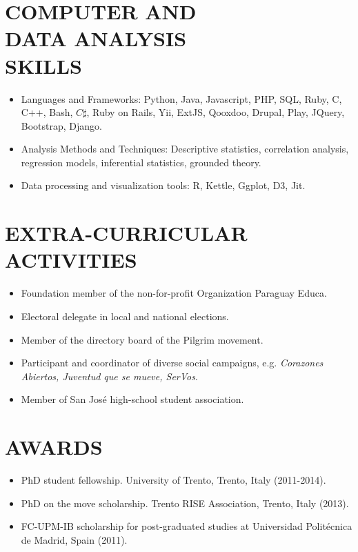 \documentclass[line,margin]{res}
\begin{document}
\begin{resume}
\section{COMPUTER AND \\ DATA ANALYSIS \\ SKILLS} 
\begin{itemize} \itemsep -2pt      
\item Languages and Frameworks: Python, Java, Javascript, PHP, SQL, Ruby, C, C++, Bash, $C\sharp$, Ruby on Rails, Yii, ExtJS, Qooxdoo, Drupal, Play, JQuery, Bootstrap, Django.
\item Analysis Methods and Techniques: Descriptive statistics, correlation analysis, regression models, inferential statistics, grounded theory.
\item Data processing and visualization tools: R, Kettle, Ggplot, D3, Jit. 
\end{itemize}

\section{EXTRA-CURRICULAR \\ ACTIVITIES}    
\begin{itemize} \itemsep -2pt      
	\item Foundation member of the non-for-profit Organization Paraguay Educa.
    \item Electoral delegate in local and national elections.
    \item Member of the directory board of the Pilgrim movement.
    \item Participant and coordinator of diverse social campaigns, e.g. {\sl Corazones Abiertos, Juventud que se mueve, SerVos}.
   \item Member of San Jos\'e high-school student association.
\end{itemize}

\section{AWARDS}
\begin{itemize} \itemsep -2pt 
	\item PhD student fellowship. University of Trento, Trento, Italy (2011-2014).
	\item PhD on the move scholarship. Trento RISE Association, Trento, Italy (2013).
	\item FC-UPM-IB scholarship for post-graduated studies at Universidad Polit\'ecnica de Madrid, Spain (2011).
\end{itemize}


\end{resume}
\end{document}
